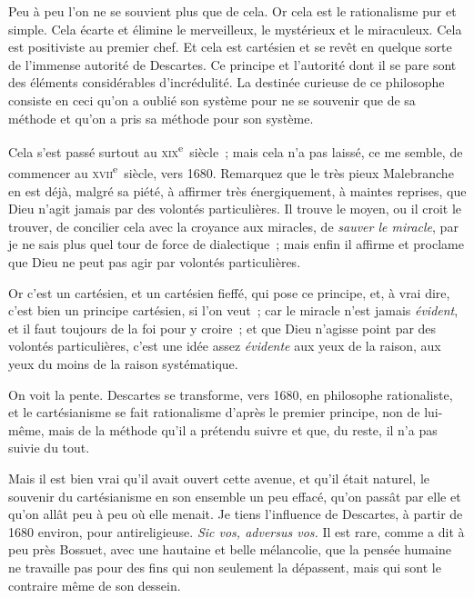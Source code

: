 \documentclass[french,twoside]{book} %
\begin{document}
Peu à peu l’on ne se souvient plus que de cela. Or cela est le rationalisme pur et simple. Cela écarte et élimine le merveilleux, le mystérieux et le miraculeux. Cela est positiviste au premier chef. Et cela est cartésien et se revêt en quelque sorte de l’immense autorité de Descartes. Ce principe et l’autorité dont il se pare sont des éléments considérables d’incrédulité. La destinée curieuse de ce philosophe consiste en ceci qu’on a oublié son système pour ne se souvenir que de sa méthode et qu’on a pris sa méthode pour son système.\par
Cela s’est passé surtout au \textsc{xix}\textsuperscript{e} siècle ; mais cela n’a pas laissé, ce me semble, de commencer au \textsc{xvii}\textsuperscript{e} siècle, vers 1680. Remarquez que le très pieux  Malebranche en est déjà, malgré sa piété, à affirmer très énergiquement, à maintes reprises, que Dieu n’agit jamais par des volontés particulières. Il trouve le moyen, ou il croit le trouver, de concilier cela avec la croyance aux miracles, de {\itshape sauver le miracle}, par je ne sais plus quel tour de force de dialectique ; mais enfin il affirme et proclame que Dieu ne peut pas agir par volontés particulières.\par
Or c’est un cartésien, et un cartésien fieffé, qui pose ce principe, et, à vrai dire, c’est bien un principe cartésien, si l’on veut ; car le miracle n’est jamais {\itshape évident}, et il faut toujours de la foi pour y croire ; et que Dieu n’agisse point par des volontés particulières, c’est une idée assez {\itshape évidente} aux yeux de la raison, aux yeux du moins de la raison systématique.\par
On voit la pente. Descartes se transforme, vers 1680, en philosophe rationaliste, et le cartésianisme se fait rationalisme d’après le premier principe, non de lui-même, mais de la méthode qu’il a prétendu suivre et que, du reste, il n’a pas suivie du tout.\par
Mais il est bien vrai qu’il avait ouvert cette avenue, et qu’il était naturel, le souvenir du cartésianisme en son ensemble un peu effacé, qu’on passât par elle et qu’on allât peu à peu où elle  menait. Je tiens l’influence de Descartes, à partir de 1680 environ, pour antireligieuse. {\itshape Sic vos, adversus vos.} Il est rare, comme a dit à peu près Bossuet, avec une hautaine et belle mélancolie, que la pensée humaine ne travaille pas pour des fins qui non seulement la dépassent, mais qui sont le contraire même de son dessein.\par
\end{document}
